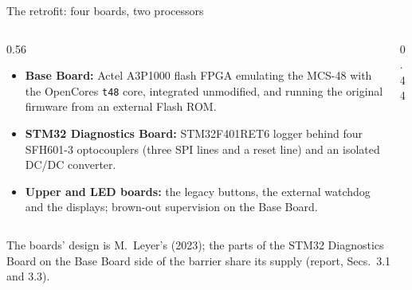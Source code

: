 \begin{frame}{The retrofit: four boards, two processors}
  \begin{columns}[T]
    \begin{column}{0.56\textwidth}
      \begin{itemize}\small
        \item \textbf{Base Board:} Actel A3P1000 flash FPGA emulating the MCS-48 with the OpenCores \texttt{t48} core, integrated unmodified, and running the original firmware from an external Flash ROM.
        \item \textbf{STM32 Diagnostics Board:} STM32F401RET6 logger behind four SFH601-3 optocouplers (three SPI lines and a reset line) and an isolated DC/DC converter.
        \item \textbf{Upper and LED boards:} the legacy buttons, the external watchdog and the displays; brown-out supervision on the Base Board.
      \end{itemize}
    \end{column}
    \begin{column}{0.44\textwidth}
      \centering
    \end{column}
  \end{columns}
  \medskip
  \footnotesize The boards' design is M.~Leyer's (2023); the parts of the STM32 Diagnostics Board on the Base Board side of the barrier share its supply (report, Secs.~3.1 and 3.3).
\end{frame}

